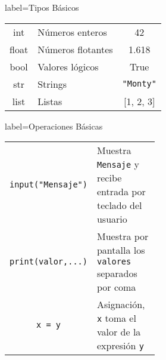 \begin{contentbox}{label=Tipos Básicos}
    \centering
    \begin{tabular}{C|l|C}
        int & Números enteros & 42\\
        float & Números flotantes & 1.618\\
        bool & Valores lógicos & True \\
        str & Strings & \lstinline!"Monty"! \\
        list & Listas & [1, 2, 3]
    \end{tabular}
\end{contentbox}

\begin{contentbox}{label=Operaciones Básicas}
    \begin{tabular}{C|p{0.5\linewidth}}
        \lstinline!input("Mensaje")! & Muestra \lstinline!Mensaje! y recibe entrada por teclado del usuario\\
        \lstinline!print(valor,...)! & Muestra por pantalla los \lstinline!valores! separados por coma \\
        \lstinline!x = y! & Asignación, \lstinline!x! toma el valor de la expresión \lstinline!y!
    \end{tabular}
\end{contentbox}

